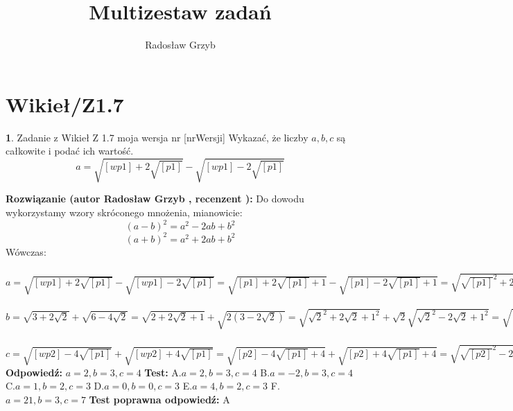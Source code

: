 \documentclass[12pt, a4paper]{article}
\title{Multizestaw zadań}
\author{Radosław Grzyb}
\date{}
\theoremstyle{definition} %
\newtheorem{zad}{}
\newcommand{\kategoria}[1]{\section{#1}} %
\newcommand{\zadStart}[1]{\begin{zad}#1\newline} %
\newcommand{\zadStop}{\end{zad}}   %
\newcommand{\rozwStart}[2]{\noindent \textbf{Rozwiązanie (autor #1 , recenzent #2): }\newline} %
\newcommand{\rozwStop}{\newline}                                            %
\newcommand{\odpStart}{\noindent \textbf{Odpowiedź:}\newline}    %
\newcommand{\odpStop}{\newline}                                             %
\newcommand{\testStart}{\noindent \textbf{Test:}\newline} %
\newcommand{\testStop}{\newline} %
\newcommand{\kluczStart}{\noindent \textbf{Test poprawna odpowiedź:}\newline} %
\newcommand{\kluczStop}{\newline} %
\begin{document}
\maketitle
\kategoria{Wikieł/Z1.7}
\zadStart{Zadanie z Wikieł Z 1.7 moja wersja nr [nrWersji]}
Wykazać, że liczby $a,b,c$ są całkowite i podać ich wartość.
$$a=\sqrt{[wp1]+2\sqrt{[p1]}}-\sqrt{[wp1]-2\sqrt{[p1]}}$$
\zadStop
\rozwStart{Radosław Grzyb}{}
Do dowodu wykorzystamy wzory skróconego mnożenia, mianowicie:
$$(a-b)^2=a^2-2ab+b^2$$
$$(a+b)^2=a^2+2ab+b^2$$
Wówczas:\\\\
$a=\sqrt{[wp1]+2\sqrt{[p1]}}-\sqrt{[wp1]-2\sqrt{[p1]}}=\sqrt{[p1]+2\sqrt{[p1]}+1}-\sqrt{[p1]-2\sqrt{[p1]}+1}=\sqrt{\sqrt{[p1]}^2+2\sqrt{[p1]}+1^2}-\sqrt{\sqrt{[p1]}^2-2\sqrt{[p1]}+1^2}=\sqrt{(\sqrt{[p1]}+1)^2}-\sqrt{(\sqrt{[p1]}-1)^2}=\sqrt{[p1]}+1-(\sqrt{[p1]}-1)=\sqrt{[p1]}+1-\sqrt{[p1]}+1=2\in\mathbb{Z}$\\\\
$b=\sqrt{3+2\sqrt{2}}+\sqrt{6-4\sqrt{2}}=\sqrt{2+2\sqrt{2}+1}+\sqrt{2(3-2\sqrt{2})}=\sqrt{\sqrt{2}^2+2\sqrt{2}+1^2}+\sqrt{2}\sqrt{\sqrt{2}^2-2\sqrt{2}+1^2}=\sqrt{(\sqrt{2}+1)^2}+\sqrt{2}\sqrt{(\sqrt{2}-1)^2}=
\sqrt{2}+1+\sqrt{2}(\sqrt{2}-1)=\sqrt{2}+1+2-\sqrt{2}=3\in\mathbb{Z}$\\\\
$c=\sqrt{[wp2]-4\sqrt{[p1]}}+\sqrt{[wp2]+4\sqrt{[p1]}}=\sqrt{[p2]-4\sqrt{[p1]}+4}+\sqrt{[p2]+4\sqrt{[p1]}+4}=\sqrt{\sqrt{[p2]}^2-2\cdot\sqrt{[p1]}\cdot2+2^2}+\sqrt{\sqrt{[p2]}^2+2\cdot\sqrt{[p1]}\cdot2+2^2}=\sqrt{(\sqrt{[p2]}-2)^2}+\sqrt{(\sqrt{[p2]}+2)^2}=\sqrt{(2-\sqrt{[p2]})^2}+\sqrt{(\sqrt{[p2]}+2)^2}=2-\sqrt{[p2]}+\sqrt{[p2]}+2=2+2=4\in\mathbb{Z}$
\rozwStop
\odpStart
$a=2,b=3,c=4$
\odpStop
\testStart
A.$a=2,b=3,c=4$
B.$a=-2,b=3,c=4$
C.$a=1,b=2,c=3$
D.$a=0,b=0,c=3$
E.$a=4,b=2,c=3$
F.$a=21,b=3,c=7$
\testStop
\kluczStart
A
\kluczStop
\end{document}

